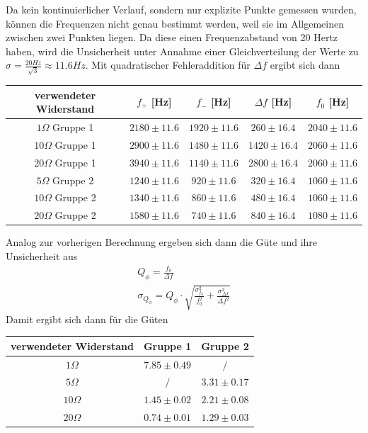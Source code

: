 \documentclass[a4paper, 11pt]{article}
\begin{document}
Da kein kontinuierlicher Verlauf, sondern nur explizite Punkte gemessen wurden, können die Frequenzen nicht genau bestimmt werden, weil sie im Allgemeinen zwischen zwei Punkten liegen. Da diese einen Frequenzabstand von 20 Hertz haben, wird die Unsicherheit unter Annahme einer Gleichverteilung der Werte zu $\sigma = \frac{20 Hz}{\sqrt{3}} \approx 11.6 Hz$. Mit quadratischer Fehleraddition für $\Delta f$ ergibt sich dann
\begin{center}
\renewcommand{\arraystretch}{1.5}
\begin{tabular}{|c|c|c|c|c|}
\hline verwendeter Widerstand	& $f_+$	[Hz]&	$f_-$	[Hz] & $\Delta f $ [Hz] &	$f_0$ [Hz]	\\
\hline $  1 \Omega $ Gruppe 1	&	$ 2180 \pm 11.6$	&	$ 1920 \pm 11.6$	&	$ 260 \pm 16.4$	&	$ 2040 \pm 11.6$	\\
\hline $ 10 \Omega $ Gruppe 1	&	$ 2900 \pm 11.6$	&	$ 1480 \pm 11.6$	&	$ 1420 \pm 16.4$	&	$ 2060 \pm 11.6$	\\
\hline $ 20 \Omega $ Gruppe 1	&	$ 3940 \pm 11.6$	&	$ 1140 \pm 11.6$	&	$ 2800 \pm 16.4$	&	$ 2060 \pm 11.6$	\\
\hline $  5 \Omega $ Gruppe 2 	&	$ 1240 \pm 11.6$	&	$ 920 \pm 11.6$	&	$ 320 \pm 16.4$	&	$ 1060 \pm 11.6$ \\
\hline $ 10 \Omega $ Gruppe 2	&	$ 1340 \pm 11.6$	&	$ 860 \pm 11.6$	&	$ 480 \pm 16.4$	&	$ 1060 \pm 11.6$	\\
\hline $ 20 \Omega $ Gruppe 2	&	$ 1580 \pm 11.6$	&	$ 740 \pm 11.6$	&	$ 840 \pm 16.4$	&	$ 1080 \pm 11.6$	\\
\hline
\end{tabular}
\end{center}
Analog zur vorherigen Berechnung ergeben sich dann die Güte und ihre Unsicherheit aus
\begin{eqnarray*}
Q_{\phi} = \frac{f_0}{\Delta f} 				\\
\sigma_{Q_{\phi}} = Q_{\phi} \cdot \sqrt{\frac{\sigma_{f_0}^2}{f_0^2} + \frac{\sigma_{\Delta f}^2}{\Delta f^2}}
\end{eqnarray*}
Damit ergibt sich dann für die Güten
\begin{center}
\renewcommand{\arraystretch}{1.5}
\begin{tabular}{|c|c|c|}
\hline verwendeter Widerstand	& Gruppe 1	& Gruppe 2	\\
\hline $  1 \Omega $		&	$ 7.85 \pm 0.49$	&	$ / $ 	\\
\hline $  5 \Omega $		&	$  / $	&	$ 3.31 \pm 0.17$	\\
\hline $ 10 \Omega $		&	$ 1.45 \pm 0.02$	&	$ 2.21 \pm 0.08$	\\
\hline $ 20 \Omega $		&	$ 0.74 \pm 0.01$	&	$ 1.29 \pm 0.03$	\\
\hline
\end{tabular}
\end{center}
\end{document}
